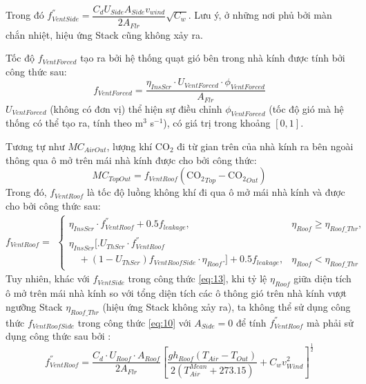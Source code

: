 \documentclass[a4paper]{article}
\begin{document}
Trong đó $f^{''}_{VentSide} = \dfrac{C_d U_{Side} A_{Side} v_{wind}}{2A_{Flr}}\sqrt{C_w}$. Lưu ý, ở những nơi phủ bởi màn chắn nhiệt, hiệu ứng Stack cũng không xảy ra. 
\par
Tốc độ $f_{VentForced}$ tạo ra bởi hệ thống quạt gió bên trong nhà kính được tính bởi công thức sau:
\begin{equation}\label{eq:14}
    f_{VentForced} = \dfrac{\eta_{InsScr}\cdot U_{VentForced}\cdot \phi_{VentForced}}{A_{Flr}}
\end{equation}
$U_{VentForced}$ (không có đơn vị) thể hiện sự điều chỉnh $\phi_{VentForced}$ (tốc độ gió mà hệ thống có thể tạo ra, tính theo m$^3$ s$^{-1}$), có giá trị trong khoảng $[0,1]$.
\par
Tương tự như $MC_{AirOut}$, lượng khí $\mathrm{CO_2}$ đi từ gian trên của nhà kính ra bên ngoài thông qua ô mở trên mái nhà kính được cho bởi công thức:
\begin{equation}\label{eq:15}
    MC_{TopOut} = f_{VentRoof}( \mathrm{CO_{2}}_{Top} - \mathrm{CO_{2}}_{Out})
\end{equation}
Trong đó, $f_{VentRoof}$ là tốc độ luồng không khí đi qua ô mở mái nhà kính và được cho bởi công thức sau:
\begin{equation}\label{eq:16}
    f_{VentRoof} =
    \begin{alignedat}{2}
        \begin{cases}
            \eta_{InsScr}\cdot f^{''}_{VentRoof} + 0.5f_{leakage},            &\eta_{Roof} \geq \eta_{Roof\_Thr}, \\
            \eta_{InsScr} \big[ \big. U_{ThScr}\cdot f^{''}_{VentRoof}                                          \\
            \quad+ (1 - U_{ThScr}) f_{VentRoofSide}\cdot \eta_{Roof} \big. \big] + 0.5f_{leakage},                                            &\eta_{Roof} < \eta_{Roof\_Thr}
        \end{cases}
    \end{alignedat}
\end{equation}
Tuy nhiên, khác với $f_{VentSide}$ trong công thức \eqref{eq:13}, khi tỷ lệ $\eta_{Roof}$ giữa diện tích ô mở trên mái nhà kính so với tổng diện tích các ô thông gió trên nhà kính vượt ngưỡng Stack $\eta_{Roof\_Thr}$ (hiệu ứng Stack không xảy ra), ta không thể sử dụng công thức $f_{VentRoofSide}$ trong công thức \eqref{eq:10} với $A_{Side} = 0$ để tính $ f^{''}_{VentRoof}$ mà phải sử dụng công thức sau bởi \cite{boulard1995modelling}:
\begin{equation}\label{eq:17}
     f^{''}_{VentRoof} = \dfrac{C_d\cdot U_{Roof}\cdot A_{Roof}}{2A_{Flr}} 
     \left[ \dfrac{gh_{Roof}(T_{Air} - T_{Out})}{2(T^{Mean}_{Air} + 273.15)} + C_w v^2_{Wind} \right]^{\frac{1}{2}}
\end{equation}
\end{document}
